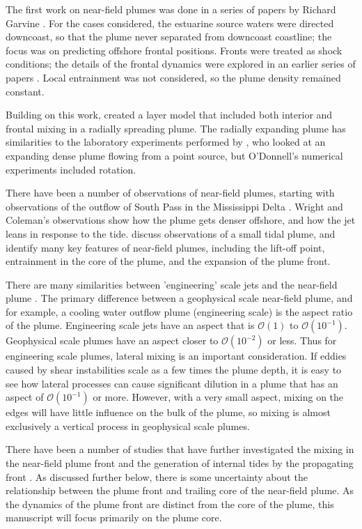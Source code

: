 \documentclass[12pt]{article}
\begin{document}
{The first work on near-field plumes was done in a series of papers by Richard Garvine \citep[notably,][]{garvine:82, odonnell.garvine:83, garvine:87}. For the cases considered, the estuarine source waters were directed downcoast, so that the plume never separated from downcoast coastline; the focus was on predicting offshore frontal positions. Fronts were treated as shock conditions; the details of the frontal dynamics were explored in an earlier series of papers \citep{garvine:74, garvine.monk:74}. Local entrainment was not considered, so the plume density remained constant. 

Building on this work, \citet{odonnell:90} created a layer model that included both interior and frontal mixing in a radially spreading plume. The radially expanding plume has similarities to the laboratory experiments performed by \citet{britter.simpson:78}, who looked at an expanding dense plume flowing from a point source, but O'Donnell's numerical experiments included rotation.

There have been a number of observations of near-field plumes, starting with observations of the outflow of South Pass in the Mississippi Delta \citep{wright.coleman:71}. Wright and Coleman's observations show how the plume gets denser offshore, and how the jet leans in response to the tide. \citet{luketina.imberger:87} discuss observations of a small tidal plume, and identify many key features of near-field plumes, including the lift-off point, entrainment in the core of the plume, and the expansion of the plume front. 

There are many similarities between 'engineering' scale jets and the near-field plume \citep[see][]{jones.ea:07}. The primary difference between a geophysical scale near-field plume, and for example, a cooling water outflow plume (engineering scale) is the aspect ratio of the plume. Engineering scale jets have an aspect that is $\mathcal{O}(1)$ to $\mathcal{O}(10^{-1})$. Geophysical scale plumes have an aspect closer to $\mathcal{O}(10^{-2})$ or less. Thus for engineering scale plumes, lateral mixing is an important consideration. If eddies caused by shear instabilities scale as a few times the plume depth, it is easy to see how lateral processes can cause significant dilution in a plume that has an aspect of $\mathcal{O}(10^{-1})$ or more. However, with a very small aspect, mixing on the edges will have little influence on the bulk of the plume, so mixing is almost exclusively a vertical process in geophysical scale plumes.

There have been a number of studies that have further investigated the mixing in the near-field plume front \citep[e.g.,][]{odonnell.ea:98, orton.jay:05, kilcher.nash:10} and the generation of internal tides by the propagating front \citep{nash.moum:05, stashchuk.vlasenko:09}. As discussed further below, there is some uncertainty about the relationship between the plume front and trailing core of the near-field plume. As the dynamics of the plume front are distinct from the core of the plume, this manuscript will focus primarily on the plume core.


}
\end{document}
